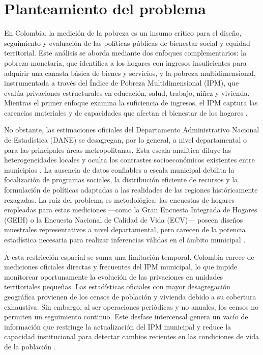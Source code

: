 \section{Planteamiento del problema}

En Colombia, la medición de la pobreza es un insumo crítico para el diseño, seguimiento y evaluación de las políticas públicas de bienestar social y equidad territorial. Este análisis se aborda mediante dos enfoques complementarios: la pobreza monetaria, que identifica a los hogares con ingresos insuficientes para adquirir una canasta básica de bienes y servicios, y la pobreza multidimensional, instrumentada a través del Índice de Pobreza Multidimensional (IPM), que evalúa privaciones estructurales en educación, salud, trabajo, niñez y vivienda. Mientras el primer enfoque examina la suficiencia de ingresos, el IPM captura las carencias materiales y de capacidades que afectan el bienestar de los hogares \cite{DANE_PobrezaMultidimensional_2023}.

No obstante, las estimaciones oficiales del Departamento Administrativo Nacional de Estadística (DANE) se desagregan, por lo general, a nivel departamental o para las principales áreas metropolitanas. Esta escala analítica diluye las heterogeneidades locales y oculta los contrastes socioeconómicos existentes entre municipios \cite{DANE_PobrezaMultidimensional_2023}. La ausencia de datos confiables a escala municipal debilita la focalización de programas sociales, la distribución eficiente de recursos y la formulación de políticas adaptadas a las realidades de las regiones históricamente rezagadas. La raíz del problema es metodológica: las encuestas de hogares empleadas para estas mediciones —como la Gran Encuesta Integrada de Hogares (GEIH) o la Encuesta Nacional de Calidad de Vida (ECV)— poseen diseños muestrales representativos a nivel departamental, pero carecen de la potencia estadística necesaria para realizar inferencias válidas en el ámbito municipal \cite{DANE_ENCV_2022}.

A esta restricción espacial se suma una limitación temporal. Colombia carece de mediciones oficiales directas y frecuentes del IPM municipal, lo que impide monitorear oportunamente la evolución de las privaciones en unidades territoriales pequeñas. Las estadísticas oficiales con mayor desagregación geográfica provienen de los censos de población y vivienda debido a su cobertura exhaustiva. Sin embargo, al ser operaciones periódicas y no anuales, los censos no permiten un seguimiento continuo. Este desfase intercensal genera un vacío de información que restringe la actualización del IPM municipal y reduce la capacidad institucional para detectar cambios recientes en las condiciones de vida de la población \cite{DANE_PobrezaMultidimensional_2023} \cite{DANE_ENCV_2022}.

